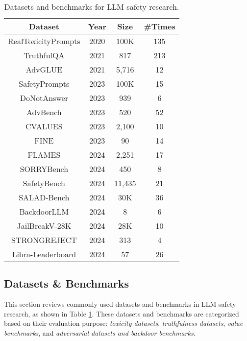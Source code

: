 \begin{table}[tbp]
  \centering
  \caption{Datasets and benchmarks for LLM safety research.}
  \setlength{\tabcolsep}{4.6mm}
    \begin{tabular}{cccc}\hline
    \rowcolor{green!10!}
    Dataset & Year  & Size  & \#Times \\
    \hline
     RealToxicityPrompts\cite{gehman2020realtoxicityprompts} & 2020  & 100K & 135 \\
     TruthfulQA\cite{lin2022truthfulqa} & 2021  & 817 & 213  \\
     AdvGLUE\cite{wang2021adversarial} & 2021  & 5,716 & 12 \\
     SafetyPrompts\cite{sun2023safety} & 2023  & 100K & 15 \\
     DoNotAnswer\cite{wang2023not} & 2023  & 939 & 6 \\
     AdvBench\cite{zou2023universal} & 2023  & 520 & 52 \\
     CVALUES\cite{xu2023cvalues} & 2023  & 2,100 & 10 \\
     FINE\cite{wang2024fake} & 2023  & 90 & 14 \\
     FLAMES\cite{huang2024flames} & 2024  & 2,251 & 17 \\
     SORRYBench\cite{xie2024sorry} & 2024  & 450 & 8 \\
     SafetyBench\cite{zhang2024safetybench} & 2024  & 11,435 & 21 \\
     SALAD-Bench\cite{li2024salad} & 2024  & 30K & 36 \\
     BackdoorLLM\cite{li2024backdoorllm} & 2024 & 8 & 6 \\
     JailBreakV-28K\cite{luo2024jailbreakv} & 2024  & 28K & 10 \\
     STRONGREJECT\cite{souly2024strongreject} & 2024  & 313 & 4 \\
     Libra-Leaderboard\cite{li2024libra} & 2024 & 57 & 26 \\
    \hline
    \end{tabular}%
  \label{tab:LLM-dataset}%
\end{table}

\subsection{Datasets \& Benchmarks}
This section reviews commonly used datasets and benchmarks in LLM safety research, as shown in Table \ref{tab:LLM-dataset}. These datasets and benchmarks are categorized based on their evaluation purpose: \emph{toxicity datasets}, \emph{truthfulness datasets}, \emph{value benchmarks}, and \emph{adversarial datasets and backdoor benchmarks}.

